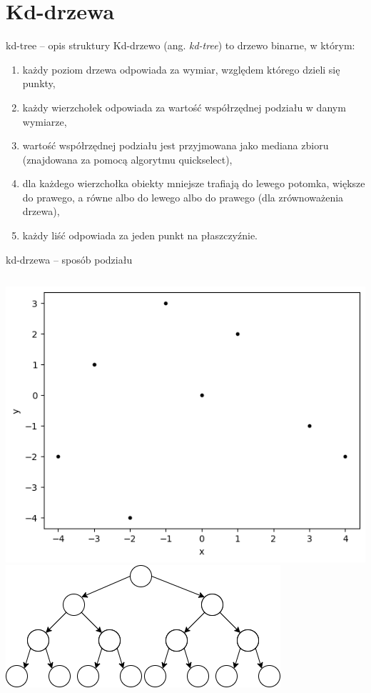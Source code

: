 \documentclass[aspectratio=169,dvipsnames]{beamer}
\begin{document}
\section{Kd-drzewa}

\begin{frame}{kd-tree -- opis struktury}
    Kd-drzewo (ang. \textit{kd-tree}) to drzewo binarne, w którym:
    \begin{enumerate}
        \item<2-> każdy poziom drzewa odpowiada za wymiar, względem którego dzieli się punkty,
        \item<3-> każdy wierzchołek odpowiada za wartość współrzędnej podziału w danym wymiarze,
        \item<4-> wartość współrzędnej podziału jest przyjmowana jako mediana zbioru (znajdowana za pomocą algorytmu quickselect),
        \item<5-> dla każdego wierzchołka obiekty mniejsze trafiają do lewego potomka, większe do prawego, a równe albo do lewego albo do prawego (dla zrównoważenia drzewa),
        \item<6-> każdy liść odpowiada za jeden punkt na płaszczyźnie.
    \end{enumerate}
\end{frame}

\begin{frame}{kd-drzewa -- sposób podziału}
    \begin{columns}
        \includegraphics[width=\textwidth]{images/plots/1}
        \includegraphics[width=\textwidth]{images/trees/1.drawio}
    \end{columns}
\end{frame}
\end{document}
